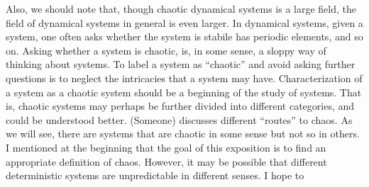 \documentclass[12pt,twoside]{book}
\begin{document}
Also, we should note that, though chaotic dynamical systems is a large field, the field of dynamical systems in general is even larger.
In dynamical systems, given a system, one often asks whether the system is stabile has periodic elements, and so on.
Asking whether a system is chaotic, is, in some sense, a sloppy way of thinking about systems.
To label a system as ``chaotic'' and avoid asking further questions is to neglect the intricacies that a system may have.
Characterization of a system as a chaotic system should be a beginning of the study of systems.
That is, chaotic systems may perhaps be further divided into different categories, and could be understood better.
(Someone) discusses different ``routes'' to chaos.
As we will see, there are systems that are chaotic in some sense but not so in others.
I mentioned at the beginning that the goal of this exposition is to find an appropriate definition of chaos.
However, it may be possible that different deterministic systems are unpredictable in different senses.
I hope to 
\end{document}
